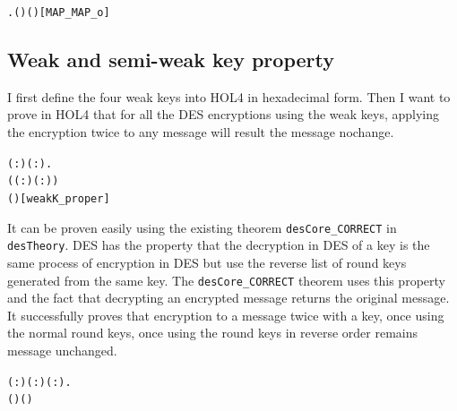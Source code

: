\documentclass{article}
\begin{document}
\begin{alltt}
\HOLTokenTurnstile{} \HOLSymConst{\HOLTokenForall{}}  .   (  ) \HOLSymConst{=}  ( \HOLSymConst{\HOLTokenCompose} ) \hfill{[MAP_MAP_o]}
\end{alltt}

\subsection{Weak and semi-weak key property}
I first define the four weak keys into HOL4 in hexadecimal form. Then I want to prove in HOL4 that for all the DES encryptions using
the weak keys, applying the encryption twice to any message will result the message nochange.

\begin{alltt}
\HOLTokenTurnstile{} \HOLSymConst{\HOLTokenForall{}}( :) ( :).
        \HOLSymConst{\HOLTokenConj{}}
       \HOLSymConst{=}
     (( : \HOLTokenMap{} )\HOLSymConst{,}( : \HOLTokenMap{} )) \HOLSymConst{\HOLTokenImp{}}
      ( ) \HOLSymConst{=} \hfill{[weakK_proper]}
\end{alltt}

It can be proven easily using the existing theorem \verb|desCore_CORRECT| in \verb|desTheory|. DES has the property that
the decryption in DES of a key is the same process of encryption in DES but use the reverse list of round keys generated
from the same key. The \verb|desCore_CORRECT| theorem uses this property and the fact that decrypting an encrypted message
returns the original message. It successfully proves that encryption to a message twice with a key,
once using the normal round keys, once using the round keys in reverse order remains message unchanged.

\begin{alltt}
\HOLTokenTurnstile{} \HOLSymConst{\HOLTokenForall{}}( : ) ( :) ( :).
       \HOLSymConst{=}  \HOLSymConst{\HOLTokenImp{}}
       ( ) (   ) \HOLSymConst{=}
\end{alltt}
\end{document}

